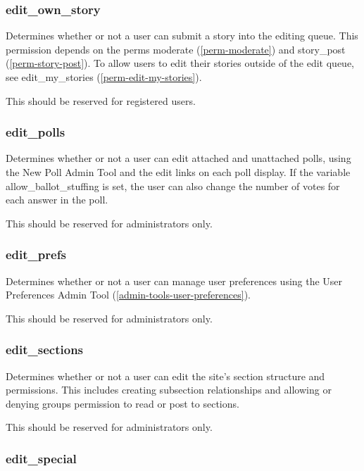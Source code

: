 \subsubsection{edit\_own\_story}
\label{perm-edit-own-story}

Determines whether or not a user can submit a story into the editing queue.  This permission depends on the perms moderate (\ref{perm-moderate}) and story\_post (\ref{perm-story-post}). To allow users to edit their stories outside of the edit queue, see edit\_my\_stories (\ref{perm-edit-my-stories}).

This should be reserved for registered users.

\subsubsection{edit\_polls}
\label{perm-edit-polls}

Determines whether or not a user can edit attached and unattached polls, using the New Poll Admin Tool and the edit links on each poll display.  If the variable allow\_ballot\_stuffing is set, the user can also change the number of votes for each answer in the poll.

This should be reserved for administrators only.

\subsubsection{edit\_prefs}
\label{edit-prefs}

Determines whether or not a user can manage user preferences using the User Preferences Admin Tool (\ref{admin-tools-user-preferences}).

This should be reserved for administrators only.

\subsubsection{edit\_sections}
\label{perm-edit-sections}

Determines whether or not a user can edit the site's section structure and permissions.  This includes creating subsection relationships and allowing or denying groups permission to read or post to sections.

This should be reserved for administrators only.

\subsubsection{edit\_special}
\label{perm-edit-special}

